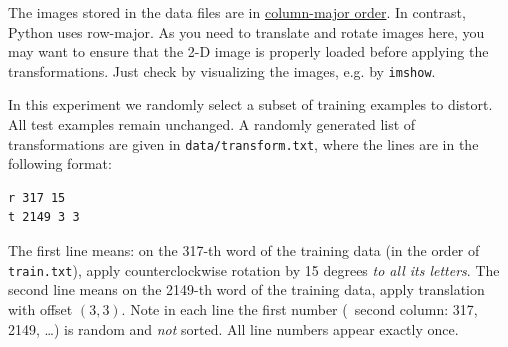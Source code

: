\documentclass[11pt]{report}
\begin{document}
The images stored in the data files are in \href{https://en.wikipedia.org/wiki/Row-_and_column-major_order}{column-major order}.
In contrast, Python uses row-major.
As you need to translate and rotate images here, 
you may want to ensure that the 2-D image is properly loaded before applying the transformations.  
Just check by visualizing the images, e.g. by \verb#imshow#.	

In this experiment
we randomly select a subset of training examples to distort.
All test examples remain unchanged.
A randomly generated list of transformations are given in \verb#data/transform.txt#, where the lines are in the following format:
%
\begin{verbatim}
r 317 15
t 2149 3 3
\end{verbatim}
The first line means: on the 317-th word of the training data (in the order of \verb#train.txt#),
apply counterclockwise rotation by 15 degrees \emph{to all its letters}.
The second line means on the 2149-th word of the training data, apply translation with offset $(3,3)$.
Note in each line the first number (\ie\ second column: 317, 2149, \ldots) is random and \emph{not} sorted.
All line numbers appear exactly once.
\end{document}
